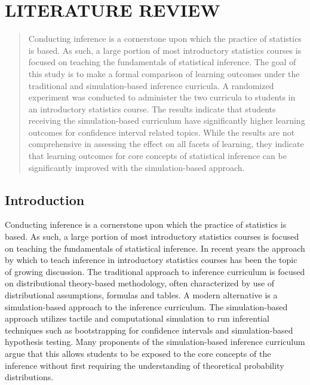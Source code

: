 \chapter{LITERATURE REVIEW}\label{litreview}

\begin{abstract}
Conducting inference is a cornerstone upon which the practice of statistics is based. As such, a large portion of most introductory statistics courses is focused on teaching the fundamentals of statistical inference. The goal of this study is to make a formal comparison of learning outcomes under the traditional and simulation-based inference curricula. A randomized experiment was conducted to administer the two curricula to students in an introductory statistics course.  The results indicate that students receiving the simulation-based curriculum have significantly higher learning outcomes for confidence interval related topics. While the results are not comprehensive in assessing the effect on all facets of learning, they indicate that learning outcomes for core concepts of statistical inference can be significantly improved with the simulation-based approach. 

\end{abstract}



\section{Introduction}
\label{intro}

Conducting inference is a cornerstone upon which the practice of statistics is based. As such, a large portion of most introductory statistics courses is focused on teaching the fundamentals of statistical inference. In recent years the approach by which to teach inference in introductory statistics courses has been the topic of growing discussion.  The traditional approach to inference curriculum is focused on distributional theory-based methodology, often characterized by use of distributional assumptions, formulas and tables. A modern alternative is a simulation-based approach to the inference curriculum. The simulation-based approach utilizes tactile and computational simulation to run inferential techniques such as bootstrapping for confidence intervals and simulation-based hypothesis testing. Many proponents of the simulation-based inference curriculum argue that this allows students to be exposed to the core concepts of the inference without first requiring the understanding of theoretical probability distributions. 


